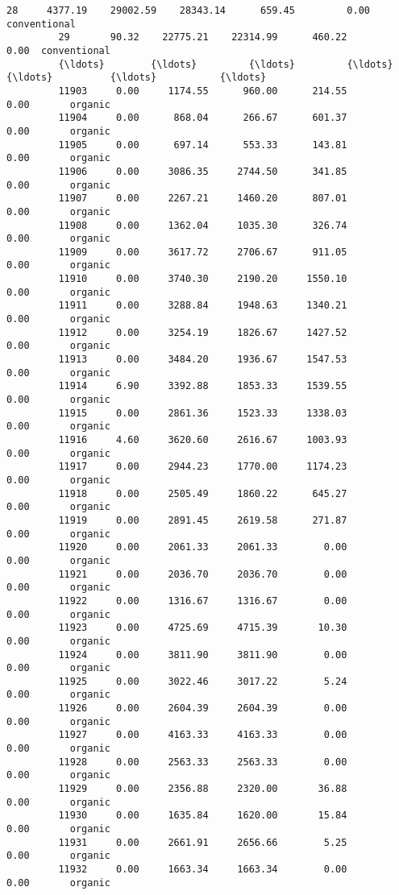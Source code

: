 \documentclass[11pt]{article}
\begin{document}
\begin{Verbatim}[commandchars=\\\{\}]
         28     4377.19    29002.59    28343.14      659.45         0.00  conventional   
         29       90.32    22775.21    22314.99      460.22         0.00  conventional   
         {\ldots}        {\ldots}         {\ldots}         {\ldots}         {\ldots}          {\ldots}           {\ldots}   
         11903     0.00     1174.55      960.00      214.55         0.00       organic   
         11904     0.00      868.04      266.67      601.37         0.00       organic   
         11905     0.00      697.14      553.33      143.81         0.00       organic   
         11906     0.00     3086.35     2744.50      341.85         0.00       organic   
         11907     0.00     2267.21     1460.20      807.01         0.00       organic   
         11908     0.00     1362.04     1035.30      326.74         0.00       organic   
         11909     0.00     3617.72     2706.67      911.05         0.00       organic   
         11910     0.00     3740.30     2190.20     1550.10         0.00       organic   
         11911     0.00     3288.84     1948.63     1340.21         0.00       organic   
         11912     0.00     3254.19     1826.67     1427.52         0.00       organic   
         11913     0.00     3484.20     1936.67     1547.53         0.00       organic   
         11914     6.90     3392.88     1853.33     1539.55         0.00       organic   
         11915     0.00     2861.36     1523.33     1338.03         0.00       organic   
         11916     4.60     3620.60     2616.67     1003.93         0.00       organic   
         11917     0.00     2944.23     1770.00     1174.23         0.00       organic   
         11918     0.00     2505.49     1860.22      645.27         0.00       organic   
         11919     0.00     2891.45     2619.58      271.87         0.00       organic   
         11920     0.00     2061.33     2061.33        0.00         0.00       organic   
         11921     0.00     2036.70     2036.70        0.00         0.00       organic   
         11922     0.00     1316.67     1316.67        0.00         0.00       organic   
         11923     0.00     4725.69     4715.39       10.30         0.00       organic   
         11924     0.00     3811.90     3811.90        0.00         0.00       organic   
         11925     0.00     3022.46     3017.22        5.24         0.00       organic   
         11926     0.00     2604.39     2604.39        0.00         0.00       organic   
         11927     0.00     4163.33     4163.33        0.00         0.00       organic   
         11928     0.00     2563.33     2563.33        0.00         0.00       organic   
         11929     0.00     2356.88     2320.00       36.88         0.00       organic   
         11930     0.00     1635.84     1620.00       15.84         0.00       organic   
         11931     0.00     2661.91     2656.66        5.25         0.00       organic   
         11932     0.00     1663.34     1663.34        0.00         0.00       organic   
         

\end{Verbatim}
\end{document}
